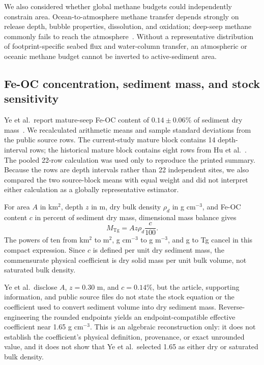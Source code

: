 \documentclass[11pt,letterpaper]{article}
\begin{document}
We also considered whether global methane budgets could independently constrain area. Ocean-to-atmosphere methane transfer depends strongly on release depth, bubble properties, dissolution, and oxidation; deep-seep methane commonly fails to reach the atmosphere~\cite{weber2019}. Without a representative distribution of footprint-specific seabed flux and water-column transfer, an atmospheric or oceanic methane budget cannot be inverted to active-sediment area.

\subsection{Fe-OC concentration, sediment mass, and stock sensitivity}

Ye et al.\ report mature-seep Fe-OC content of $0.14\pm0.06\%$ of sediment dry mass~\cite{ye2026}. We recalculated arithmetic means and sample standard deviations from the public source rows. The current-study mature block contains 14 depth-interval rows; the historical mature block contains eight rows from Hu et al.~\cite{hu2025}. The pooled 22-row calculation was used only to reproduce the printed summary. Because the rows are depth intervals rather than 22 independent sites, we also compared the two source-block means with equal weight and did not interpret either calculation as a globally representative estimator.

For area $A$ in km$^2$, depth $z$ in m, dry bulk density $\rho_d$ in g cm$^{-3}$, and Fe-OC content $c$ in percent of sediment dry mass, dimensional mass balance gives
\begin{equation}
M_{\mathrm{Tg}} =
A z \rho_d \frac{c}{100}.
\label{eq:stock}
\end{equation}
The powers of ten from km$^2$ to m$^2$, g cm$^{-3}$ to g m$^{-3}$, and g to Tg cancel in this compact expression. Since $c$ is defined per unit dry sediment mass, the commensurate physical coefficient is dry solid mass per unit bulk volume, not saturated bulk density.

Ye et al.\ disclose $A$, $z=0.30$ m, and $c=0.14\%$, but the article, supporting information, and public source files do not state the stock equation or the coefficient used to convert sediment volume into dry sediment mass. Reverse-engineering the rounded endpoints yields an endpoint-compatible effective coefficient near 1.65 g cm$^{-3}$. This is an algebraic reconstruction only: it does not establish the coefficient's physical definition, provenance, or exact unrounded value, and it does not show that Ye et al.\ selected 1.65 as either dry or saturated bulk density.
\end{document}
